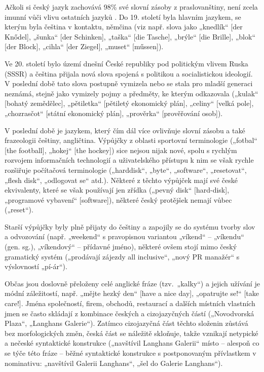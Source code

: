 \begin{multicols}{2}
Ačkoli si český jazyk zachovává 98\% své slovní zásoby z praslovanštiny, není zcela imunní vůči vlivu ostatních jazyků \cite{Note5}. Do 19. století byla hlavním jazykem, se kterým byla čeština v kontaktu, němčina (viz např. slova jako „knedlík“ {[}der Knődel{]}, „šunka“ {[}der Schinken{]}, „taška“ {[}die Tasche{]}, „brýle“ {[}die Brille{]}, „blok“ {[}der Block{]}, „cihla“ {[}der Ziegel{]}, „muset“ {[}műssen{]}).

Ve 20. století bylo území dnešní České republiky pod politickým vlivem Ruska (SSSR) a čeština přijala nová slova spojená s politikou a socialistickou ideologií. V poslední době tato slova postupně vymizela nebo se stala pro mladší generaci neznámá, stejně jako vymizely pojmy a předměty, ke kterým odkazovala („kulak“ {[}bohatý zemědělec{]}, „pětiletka“ {[}pětiletý ekonomický plán{]}, „celiny“ {[}velká pole{]}, „chozrasčot“ {[}státní ekonomický plán{]}, „prověrka“ {[}prověřování osob{]}).

V poslední době je jazykem, který čím dál více ovlivňuje slovní zásobu a také frazeologii češtiny, angličtina. Výpůjčky z oblasti sportovní terminologie („fotbal“ {[}the football{]}, „hokej“ {[}the hockey{]}) sice nejsou nijak nové, spolu s rychlým rozvojem informačních technologií a uživatelského přístupu k nim se však rychle rozšiřuje počítačová terminologie („harddisk“, „byte“, „software“, „resetovat“, „flesh disk“, „odlogovat se“ atd.). Některé z těchto výpůjček mají své české ekvivalenty, které se však používají jen zřídka („pevný disk“ {[}hard-disk{]}, „programové vybavení“ {[}software{]}), některé český protějšek nemají vůbec („reset“).

Starší výpůjčky byly plně přijaty do češtiny a zapojily se do systému tvorby slov a odvozování (např. „weekend“ s pravopisnou variantou „víkend“ – „víkendu“ (gen. sg.), „víkendový“ – přídavné jméno), některé ovšem stojí mimo český gramatický systém („prodávají zájezdy all inclusive“, „nový PR manažér“ s výslovností „pí-ár“).

Občas jsou doslovně přeloženy celé anglické fráze (tzv.~„kalky“) a jejich užívání je módní záležitostí, např. „mějte hezký den“ {[}have a nice day{]}, „opatrujte se!“ {[}take care!{]}. Jména společností, firem, obchodů, restaurací a dalších místních vlastních jmen se často skládají z kombinace českých a cizojazyčných částí („Novodvorská Plaza“, „Langhans Galerie“). Zatímco cizojazyčná část těchto složenin zůstává bez morfologických změn, česká část se náležitě skloňuje, takže vznikají netypické a nečeské syntaktické konstrukce („navštívil Langhans Galerii“ místo – alespoň co se týče této fráze – běžné syntaktické konstrukce s postponovaným přívlastkem v nominativu: „navštívil Galerii Langhans“, „šel do Galerie Langhans“).


\end{multicols}
